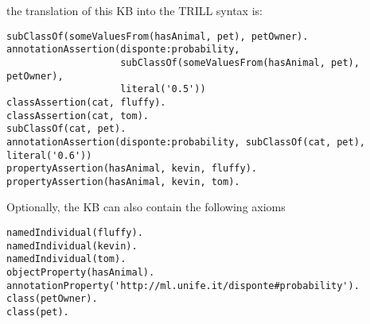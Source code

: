 the translation of this KB into the TRILL syntax is:
\begin{verbatim}
subClassOf(someValuesFrom(hasAnimal, pet), petOwner).
annotationAssertion(disponte:probability,
                    subClassOf(someValuesFrom(hasAnimal, pet), petOwner),
                    literal('0.5'))
classAssertion(cat, fluffy).
classAssertion(cat, tom).
subClassOf(cat, pet).
annotationAssertion(disponte:probability, subClassOf(cat, pet), literal('0.6'))
propertyAssertion(hasAnimal, kevin, fluffy).
propertyAssertion(hasAnimal, kevin, tom).
\end{verbatim}
Optionally, the KB can also contain the following axioms
\begin{verbatim}
namedIndividual(fluffy).
namedIndividual(kevin).
namedIndividual(tom).
objectProperty(hasAnimal).
annotationProperty('http://ml.unife.it/disponte#probability').
class(petOwner).
class(pet).
\end{verbatim}


